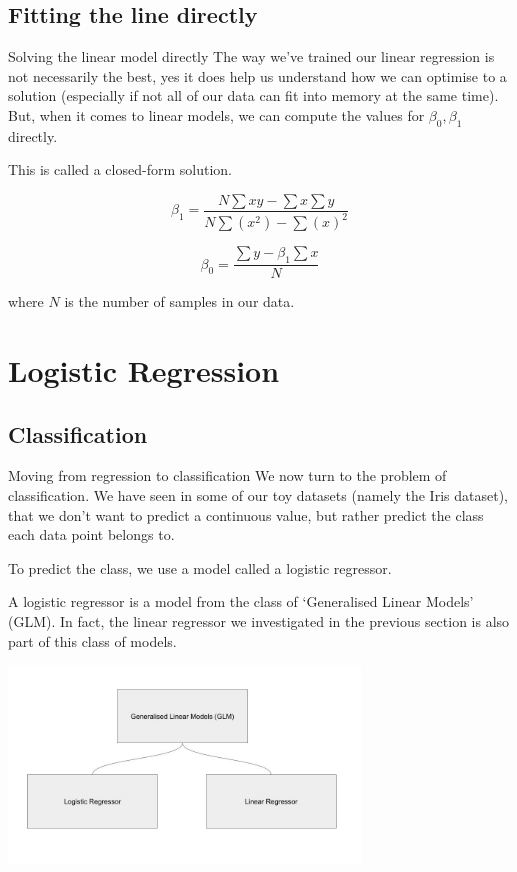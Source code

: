 \documentclass[10pt]{beamer}
\begin{document}
\subsection*{Fitting the line directly}
\label{sec:org155850c}
\begin{frame}[label={sec:orgeb68080}]{Solving the linear model directly}
The way we've trained our linear regression is not necessarily the
best, yes it does help us understand how we can optimise to a solution
(especially if not all of our data can fit into memory at the same
time). But, when it comes to linear models, we can compute the values
for \(\beta_0, \beta_1\) directly.

This is called a \alert{closed-form solution}.

\[
\beta_1 = \frac{N \sum xy - \sum x \sum y}{N \sum (x^2) - \sum (x)^2}
\]

\[
\beta_0 = \frac{\sum y - \beta_1 \sum x}{N}
\]

where \(N\) is the number of samples in our data.
\end{frame}

\section*{Logistic Regression}
\label{sec:org0752365}

\subsection*{Classification}
\label{sec:org223ad67}

\begin{frame}[label={sec:orgc66cf17}]{Moving from regression to classification}
We now turn to the problem of classification. We have seen in some of
our toy datasets (namely the Iris dataset), that we don't want to
predict a continuous value, but rather predict the class each data
point belongs to.

To predict the class, we use a model called a logistic regressor.

A logistic regressor is a model from the class of `Generalised Linear
Models' (GLM). In fact, the linear regressor we investigated in the
previous section is also part of this class of models.

\begin{center}
\includegraphics[width=0.7\textwidth]{images/glm.jpg}
\end{center}
\end{frame}
\end{document}
